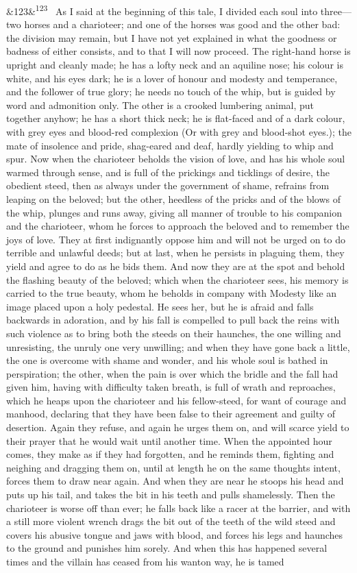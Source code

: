 \documentclass[12pt]{article}
\newcommand{\para}[1][]{\par\noindent\ifx&#1&\else\textsuperscript{\footnotesize #1}~\fi}
\begin{document}
\para[123] As I said at the beginning of this tale, I divided each soul into three---two horses and a charioteer; and one of the horses was good and the other bad: the division may remain, but I have not yet explained in what the goodness or badness of either consists, and to that I will now proceed. The right-hand horse is upright and cleanly made; he has a lofty neck and an aquiline nose; his colour is white, and his eyes dark; he is a lover of honour and modesty and temperance, and the follower of true glory; he needs no touch of the whip, but is guided by word and admonition only. The other is a crooked lumbering animal, put together anyhow; he has a short thick neck; he is flat-faced and of a dark colour, with grey eyes and blood-red complexion (Or with grey and blood-shot eyes.); the mate of insolence and pride, shag-eared and deaf, hardly yielding to whip and spur. Now when the charioteer beholds the vision of love, and has his whole soul warmed through sense, and is full of the prickings and ticklings of desire, the obedient steed, then as always under the government of shame, refrains from leaping on the beloved; but the other, heedless of the pricks and of the blows of the whip, plunges and runs away, giving all manner of trouble to his companion and the charioteer, whom he forces to approach the beloved and to remember the joys of love. They at first indignantly oppose him and will not be urged on to do terrible and unlawful deeds; but at last, when he persists in plaguing them, they yield and agree to do as he bids them. And now they are at the spot and behold the flashing beauty of the beloved; which when the charioteer sees, his memory is carried to the true beauty, whom he beholds in company with Modesty like an image placed upon a holy pedestal. He sees her, but he is afraid and falls backwards in adoration, and by his fall is compelled to pull back the reins with such violence as to bring both the steeds on their haunches, the one willing and unresisting, the unruly one very unwilling; and when they have gone back a little, the one is overcome with shame and wonder, and his whole soul is bathed in perspiration; the other, when the pain is over which the bridle and the fall had given him, having with difficulty taken breath, is full of wrath and reproaches, which he heaps upon the charioteer and his fellow-steed, for want of courage and manhood, declaring that they have been false to their agreement and guilty of desertion. Again they refuse, and again he urges them on, and will scarce yield to their prayer that he would wait until another time. When the appointed hour comes, they make as if they had forgotten, and he reminds them, fighting and neighing and dragging them on, until at length he on the same thoughts intent, forces them to draw near again. And when they are near he stoops his head and puts up his tail, and takes the bit in his teeth and pulls shamelessly. Then the charioteer is worse off than ever; he falls back like a racer at the barrier, and with a still more violent wrench drags the bit out of the teeth of the wild steed and covers his abusive tongue and jaws with blood, and forces his legs and haunches to the ground and punishes him sorely. And when this has happened several times and the villain has ceased from his wanton way, he is tamed 
\end{document}
